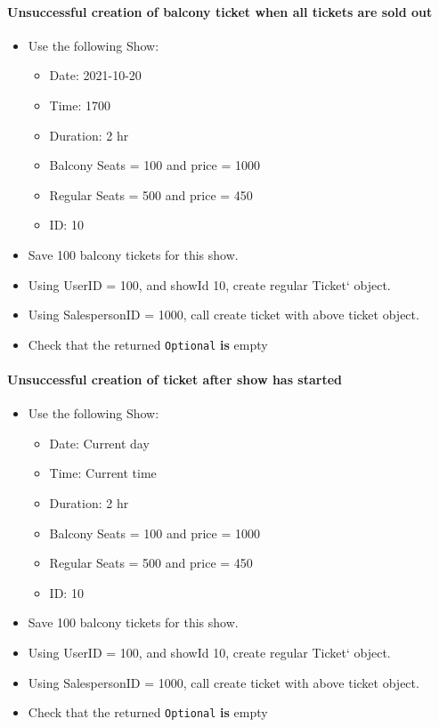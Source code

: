 \documentclass[]{article}
\providecommand{\tightlist}{%
  \setlength{\itemsep}{0pt}\setlength{\parskip}{0pt}}
\let\oldparagraph\paragraph
\renewcommand{\paragraph}[1]{\oldparagraph{#1}\mbox{}}
\begin{document}
\hypertarget{unsuccessful-creation-of-balcony-ticket-when-all-tickets-are-sold-out}{%
\paragraph{Unsuccessful creation of balcony ticket when all tickets are
sold
out}\label{unsuccessful-creation-of-balcony-ticket-when-all-tickets-are-sold-out}}

\begin{itemize}
\tightlist
\item
  Use the following Show:

  \begin{itemize}
  \tightlist
  \item
    Date: 2021-10-20
  \item
    Time: 1700
  \item
    Duration: 2 hr
  \item
    Balcony Seats = 100 and price = 1000
  \item
    Regular Seats = 500 and price = 450
  \item
    ID: 10
  \end{itemize}
\item
  Save 100 balcony tickets for this show.
\item
  Using UserID = 100, and showId 10, create regular Ticket` object.
\item
  Using SalespersonID = 1000, call create ticket with above ticket
  object.
\item
  Check that the returned \texttt{Optional} \textbf{is} empty
\end{itemize}

\hypertarget{unsuccessful-creation-of-ticket-after-show-has-started}{%
\paragraph{Unsuccessful creation of ticket after show has
started}\label{unsuccessful-creation-of-ticket-after-show-has-started}}

\begin{itemize}
\tightlist
\item
  Use the following Show:

  \begin{itemize}
  \tightlist
  \item
    Date: Current day
  \item
    Time: Current time
  \item
    Duration: 2 hr
  \item
    Balcony Seats = 100 and price = 1000
  \item
    Regular Seats = 500 and price = 450
  \item
    ID: 10
  \end{itemize}
\item
  Save 100 balcony tickets for this show.
\item
  Using UserID = 100, and showId 10, create regular Ticket` object.
\item
  Using SalespersonID = 1000, call create ticket with above ticket
  object.
\item
  Check that the returned \texttt{Optional} \textbf{is} empty
\end{itemize}
\end{document}
